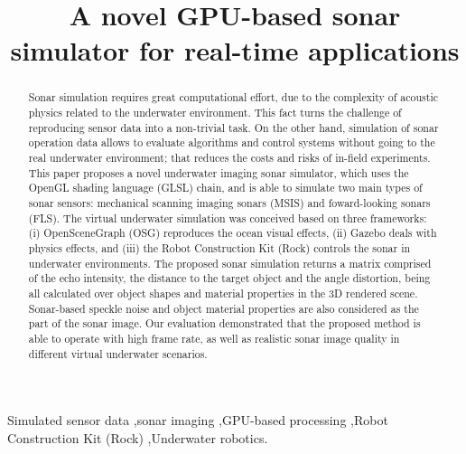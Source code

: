 \documentclass[final,5p,times]{elsarticle}
\begin{document}
\begin{frontmatter}


\title{A novel GPU-based sonar simulator for real-time applications}



\begin{abstract}

Sonar simulation requires great computational effort, due to the complexity of acoustic physics related to the underwater environment. This fact turns the challenge of reproducing sensor data into a non-trivial task. On the other hand, simulation of sonar operation data allows to evaluate algorithms and control systems without going to the real underwater environment; that reduces the costs and risks of in-field experiments. This paper proposes a novel underwater imaging sonar simulator, which uses the OpenGL shading language (GLSL) chain, and is able to simulate two main types of sonar sensors: mechanical scanning imaging sonars (MSIS) and foward-looking sonars (FLS). The virtual underwater simulation was conceived based on three frameworks: (i) OpenSceneGraph (OSG) reproduces the ocean visual effects, (ii) Gazebo deals with physics effects, and (iii) the Robot Construction Kit (Rock) controls the sonar in underwater environments. The proposed sonar simulation returns a matrix comprised of the echo intensity, the distance to the target object and the angle distortion, being all calculated over object shapes and material properties in the 3D rendered scene. Sonar-based speckle noise and object material properties are also considered as the part of the sonar image. Our evaluation demonstrated that the proposed method is able to operate with high frame rate, as well as realistic sonar image quality in different virtual underwater scenarios.

\end{abstract}

\begin{keyword}
Simulated sensor data \sep sonar imaging \sep GPU-based processing \sep Robot Construction Kit (Rock) \sep Underwater robotics.

\end{keyword}

\end{frontmatter}
\end{document}
